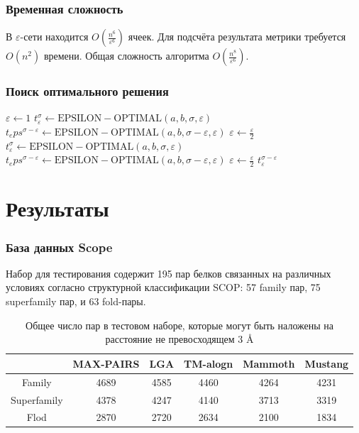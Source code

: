 \documentclass{beamer}
\newcommand{\angstrom}{\textup{\AA}}
\newcommand{\eps}{\varepsilon}
\newcommand{\la}{\leftarrow}
\begin{document}
\begin{frame}
\frametitle{Временная сложность}
В $\eps$-сети находится $O(\frac{n^6}{\eps^6})$ ячеек.
\vfill
Для подсчёта результата метрики требуется $O(n^2)$ времени.
\vfill
Общая сложность алгоритма $O(\frac{n^8}{\eps^6})$.
\end{frame}

\begin{frame}
\frametitle{Поиск оптимального решения}
\begin{algorithmic}[1]
\State $\eps \la 1$
\State $t_\eps^\sigma \la \mathrm{EPSILON-OPTIMAL}(a, b, \sigma, \eps)$
\State $t_eps^{\sigma - \eps} \la \mathrm{EPSILON-OPTIMAL}(a, b, \sigma - \eps, \eps)$
\State $\eps \la \frac{\eps}{2}$
\While{$|S(a, t_\eps^\sigma (b), \sigma + \eps )| - |S(a, t_\eps^{\sigma - \eps}(b), \sigma ) > 0$}
\State $t_\eps^\sigma \la \mathrm{EPSILON-OPTIMAL}(a, b, \sigma, \eps)$
\State $t_eps^{\sigma - \eps} \la \mathrm{EPSILON-OPTIMAL}(a, b, \sigma - \eps, \eps)$
\State $\eps \la \frac{\eps}{2}$
\EndWhile
\State \Return $t_\eps^{\sigma - \eps}$
\end{algorithmic}
\end{frame}

\section{Результаты}

\begin{frame}
\frametitle{База данных Scope}
Набор для тестирования содержит 195 пар белков связанных на различных условиях согласно структурной классификации SCOP: 57 family пар, 75 superfamily пар, и 63 fold-пары.\\
\begin{table}[H]
\caption{ Общее число пар в тестовом наборе, которые могут быть наложены на расстояние не превосходящем 3 \angstrom}
\begin{center}
\begin{tabular}{|c|ccccc|}
\hline
& MAX-PAIRS & LGA & TM-alogn & Mammoth & Mustang\\
\hline
Family & 4689 & 4585 & 4460 & 4264 & 4231\\
Superfamily & 4378 & 4247 & 4140 & 3713 & 3319\\
Flod & 2870 & 2720 & 2634 & 2100 & 1834\\
\hline
\end{tabular}
\end{center}
\end{table}
\end{frame}
\end{document}
